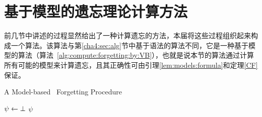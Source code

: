 %	
%	
%	


\section{基于模型的遗忘理论计算方法}
前几节中讲述的过程显然给出了一种计算遗忘的方法，本届将这些过程组织起来构成一个算法。该算法与第\ref{cha4:sec:alg}节中基于语法的算法不同，它是一种基于模型的算法（算法~\ref{alg:compute:forgetting:by:VB}），也就是说本节的算法通过计算所有可能的模型来计算遗忘，且其正确性可由引理\ref{lem:models:formula}和定理\ref{CF}保证。


\begin{algorithm}[tb]
	\caption{\small A Model-based \CTL\ Forgetting Procedure}
	\label{alg:compute:forgetting:by:VB}
	\LinesNumbered
	$\psi \leftarrow \bot$\;
	\Return $\psi$\;
\end{algorithm}



